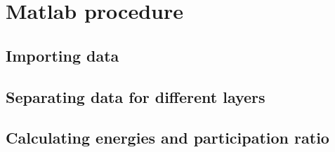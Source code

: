 \chapter{Matlab procedure}

\section{Importing data}

\section{Separating data for different layers}

\section{Calculating energies and participation ratio}